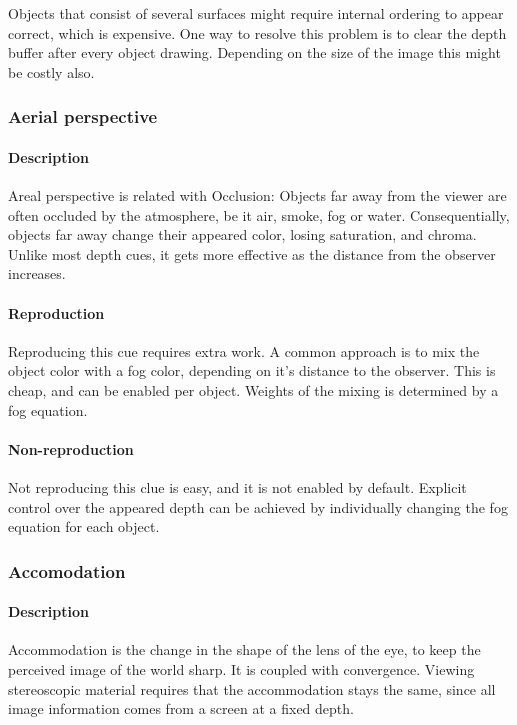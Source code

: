 Objects that consist of several surfaces might require internal ordering to appear correct, which is expensive. One way to resolve this problem is to clear the depth buffer after every object drawing. Depending on the size of the image this might be costly also.


\subsubsection{Aerial perspective}
\paragraph{Description}
Areal perspective is related with Occlusion: Objects far away from the viewer are often occluded by the atmosphere, be it air, smoke, fog or water. Consequentially, objects far away change their appeared color, losing saturation, and chroma.
Unlike most depth cues, it gets more effective as the distance from the observer increases.

\paragraph{Reproduction}
Reproducing this cue requires extra work. A common approach is to mix the object color with a fog color, depending on it's distance to the observer. This is cheap, and can be enabled per object\cite{fog}. Weights of the mixing is determined by a fog equation.

\paragraph{Non-reproduction}
Not reproducing this clue is easy, and it is not enabled by default. Explicit control over the appeared depth can be achieved by individually changing the fog equation for each object.


\subsubsection{Accomodation}
\paragraph{Description}
Accommodation is the change in the shape of the lens of the eye, to keep the perceived image of the world sharp\cite{accommodation}. It is coupled with convergence. Viewing stereoscopic material requires that the accommodation stays the same, since all image information comes from a screen at a fixed depth.

